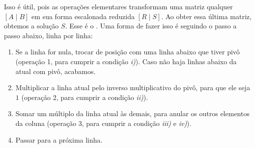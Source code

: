 \documentclass[../main.tex]{subfiles}
\begin{document}
			Isso é útil, pois as operações elementares transformam uma matriz qualquer $[A\mid B]$ em sua forma escalonada reduzida $[R\mid S]$. Ao obter essa última matriz, obtemos a solução $S$.
			Esse é o . Uma forma de fazer isso é seguindo o passo a passo abaixo, linha por linha:
			\begin{enumerate}
				\item Se a linha for nula, trocar de posição com uma linha abaixo que tiver pivô (operação 1, para cumprir a condição \textit{i)}). Caso não haja linhas abaixo da atual com pivô, acabamos.
				\item Multiplicar a linha atual pelo inverso multiplicativo do pivô, para que ele seja $1$ (operação 2, para cumprir a condição \textit{ii)}).
				\item Somar um múltiplo da linha atual às demais, para anular os outros elementos da coluna (operação 3, para cumprir a condição \textit{iii)} e \textit{iv)}).
				\item Passar para a próxima linha.
			\end{enumerate}
			
\end{document}
